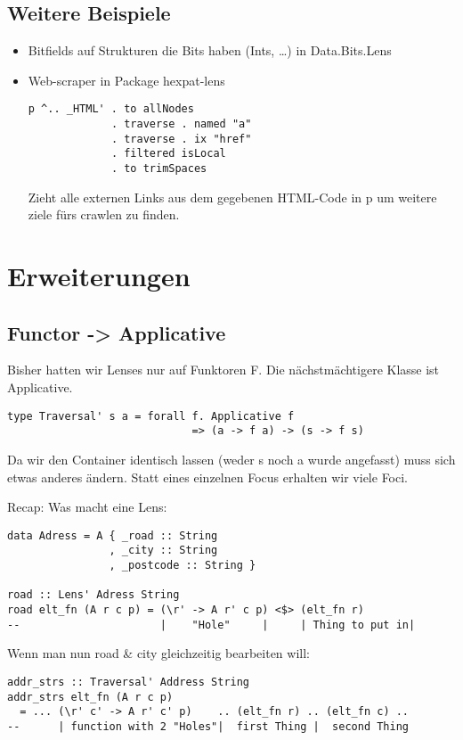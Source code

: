 \documentclass{beamer}
\begin{document}
\subsection{Weitere Beispiele}
\begin{frame}[fragile]
\begin{itemize}
\item
  Bitfields auf Strukturen die Bits haben (Ints, \ldots{}) in
  Data.Bits.Lens
  \pause
\item
  Web-scraper in Package hexpat-lens

\begin{verbatim}
p ^.. _HTML' . to allNodes
             . traverse . named "a"
             . traverse . ix "href"
             . filtered isLocal
             . to trimSpaces
\end{verbatim}

  Zieht alle externen Links aus dem gegebenen HTML-Code in p um weitere
  ziele fürs crawlen zu finden.
\end{itemize}
\end{frame}

\section{Erweiterungen}
\subsection{Functor -> Applicative}
\begin{frame}[fragile]
Bisher hatten wir Lenses nur auf Funktoren F. Die nächstmächtigere
Klasse ist Applicative.
\pause
\begin{verbatim}
type Traversal' s a = forall f. Applicative f
                             => (a -> f a) -> (s -> f s)
\end{verbatim}
\pause
Da wir den Container identisch lassen (weder s noch a wurde angefasst)
muss sich etwas anderes ändern. Statt eines einzelnen Focus erhalten wir
viele Foci.
\end{frame}

\begin{frame}[fragile]
Recap: Was macht eine Lens:

\begin{verbatim}
data Adress = A { _road :: String
                , _city :: String
                , _postcode :: String }

road :: Lens' Adress String
road elt_fn (A r c p) = (\r' -> A r' c p) <$> (elt_fn r)
--                      |    "Hole"     |     | Thing to put in|
\end{verbatim}
\pause
Wenn man nun road \& city gleichzeitig bearbeiten will:

\begin{verbatim}
addr_strs :: Traversal' Address String
addr_strs elt_fn (A r c p)
  = ... (\r' c' -> A r' c' p)    .. (elt_fn r) .. (elt_fn c) ..
--      | function with 2 "Holes"|  first Thing |  second Thing
\end{verbatim}
\end{frame}
\end{document}
